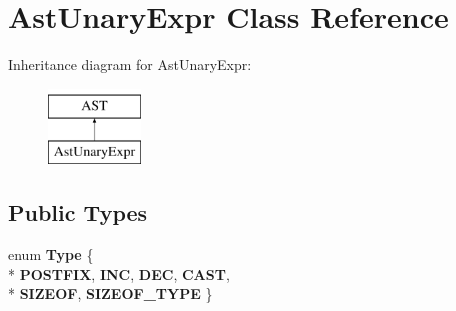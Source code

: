 \hypertarget{classAstUnaryExpr}{\section{Ast\-Unary\-Expr Class Reference}
\label{classAstUnaryExpr}
}
Inheritance diagram for Ast\-Unary\-Expr\-:\begin{figure}[H]
\begin{center}
\leavevmode
\includegraphics[height=2.000000cm]{classAstUnaryExpr}
\end{center}
\end{figure}
\subsection*{Public Types}
\begin{DoxyCompactItemize}
\item 
enum {\bfseries Type} \{ \\*
{\bfseries P\-O\-S\-T\-F\-I\-X}, 
{\bfseries I\-N\-C}, 
{\bfseries D\-E\-C}, 
{\bfseries C\-A\-S\-T}, 
\\*
{\bfseries S\-I\-Z\-E\-O\-F}, 
{\bfseries S\-I\-Z\-E\-O\-F\-\_\-\-T\-Y\-P\-E}
 \}
\end{DoxyCompactItemize}
